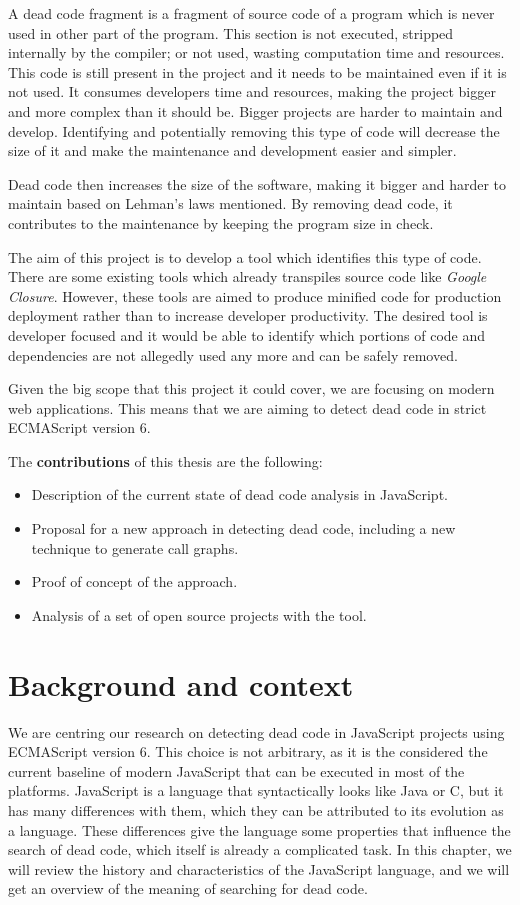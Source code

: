 \documentclass{uvamscse}
\begin{document}
A dead code fragment is a fragment of source code of a program which is never used in other part of the program. This section is not executed, stripped internally by the compiler; or not used, wasting computation time and resources. This code is still present in the project and it needs to be maintained even if it is not used. It consumes developers time and resources, making the project bigger and more complex than it should be. Bigger projects are harder to maintain and develop. Identifying and potentially removing this type of code will decrease the size of it and make the maintenance and development easier and simpler.

Dead code then increases the size of the software, making it bigger and harder to maintain based on Lehman's laws mentioned. By removing dead code, it contributes to the maintenance by keeping the program size in check.

The aim of this project is to develop a tool which identifies this type of code. There are some existing tools which already transpiles source code like \textit{Google Closure}. However, these tools are aimed to produce minified code for production deployment rather than to increase developer productivity. The desired tool is developer focused and it would be able to identify which portions of code and dependencies are not allegedly used any more and can be safely removed.

Given the big scope that this project it could cover, we are focusing on modern web applications. This means that we are aiming to detect dead code in strict ECMAScript version 6.

The \textbf{contributions} of this thesis are the following:
\begin{itemize}
    \item Description of the current state of dead code analysis in JavaScript.
    \item Proposal for a new approach in detecting dead code, including a new technique to generate call graphs.
    \item Proof of concept of the approach.
    \item Analysis of a set of open source projects with the tool.
\end{itemize}

\chapter{Background and context}
We are centring our research on detecting dead code in JavaScript projects using ECMAScript version 6. This choice is not arbitrary, as it is the considered the current baseline of modern JavaScript that can be executed in most of the platforms. JavaScript is a language that syntactically looks like Java or C, but it has many differences with them, which they can be attributed to its evolution as a language. These differences give the language some properties that influence the search of dead code, which itself is already a complicated task. In this chapter, we will review the history and characteristics of the JavaScript language, and we will get an overview of the meaning of searching for dead code.
\end{document}
